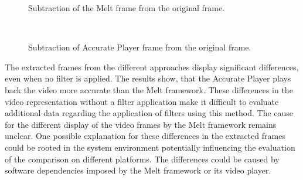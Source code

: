 \documentclass[../MasterThesis.tex]{subfiles}
\begin{document}
\begin{minipage}{0.48\textwidth}
	\begin{figure}[H]
		\begin{center}
			\caption[Subtraction of the Melt frame from the original frame.]{Subtraction of the Melt frame from the original frame.}
			\label{figure:oVSmelt}
		\end{center}
	\end{figure}
\end{minipage}\begin{minipage}{0.04\textwidth}
	\ 
\end{minipage}\begin{minipage}{0.48\textwidth}
	\begin{figure}[H]
		\begin{center}
			\caption[Subtraction of Accurate Player frame from the original frame.]{Subtraction of Accurate Player frame from the original frame.}
			\label{figure:oVSap}
		\end{center}
	\end{figure}
\end{minipage}








\vspace*{1.5em}
The extracted frames from the different approaches display significant differences, even when no filter is applied. 
The results show, that the Accurate Player plays back the video more accurate than the Melt framework.
These differences in the video representation without a filter application make it difficult to evaluate additional data regarding the application of filters using this method. The cause for the different display of the video frames by the Melt framework remains unclear.
%
%
One possible explanation for these differences in the extracted frames could be rooted in the system environment potentially influencing the evaluation of the comparison on different platforms. The differences could be caused by software dependencies imposed by the Melt framework or its video player.
\end{document}
